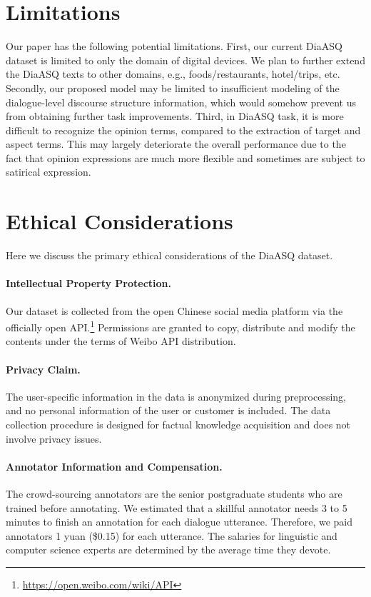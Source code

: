 \documentclass[11pt]{article}
\begin{document}
\section*{Limitations}
Our paper has the following potential limitations.
First, our current DiaASQ dataset is limited to only the domain of digital devices.
We plan to further extend the DiaASQ texts to other domains, e.g., foods/restaurants, hotel/trips, etc.
Secondly, our proposed model may be limited to insufficient modeling of the dialogue-level discourse structure information, which would somehow prevent us from obtaining further task improvements.
Third, in DiaASQ task, it is more difficult to recognize the opinion terms, compared to the extraction of target and aspect terms.
This may largely deteriorate the overall performance due to the fact that opinion expressions are much more flexible and sometimes are subject to satirical expression.

\section*{Ethical Considerations}
Here we discuss the primary ethical considerations of the DiaASQ dataset.

\vspace{-4pt}
\paragraph{Intellectual Property Protection.}
Our dataset is collected from the open Chinese social media platform via the officially open API.\footnote{\url{https://open.weibo.com/wiki/API}}
Permissions are granted to copy, distribute and modify the contents under the terms of Weibo API distribution.

\vspace{-4pt}
\paragraph{Privacy Claim.}
The user-specific information in the data is anonymized during preprocessing, and no personal information of the user or customer is included.
The data collection procedure is designed for factual knowledge acquisition and does not involve privacy issues.

\vspace{-4pt}
\paragraph{Annotator Information and Compensation.}
The crowd-sourcing annotators are the senior postgraduate students who are trained before annotating.
We estimated that a skillful annotator needs 3 to 5 minutes to finish an annotation for each dialogue utterance.
Therefore, we paid annotators 1 yuan (\$0.15) for each utterance. 
The salaries for linguistic and computer science experts are determined by the average time they devote.
\end{document}

